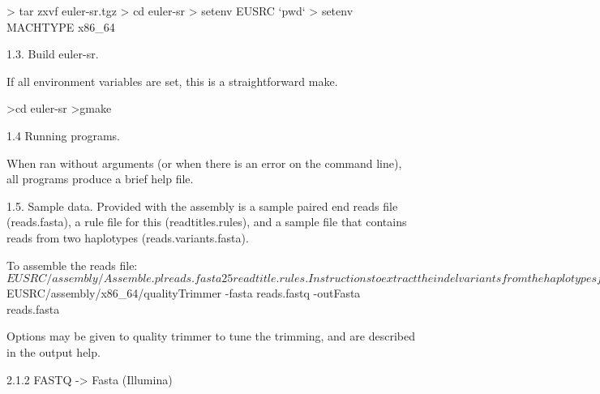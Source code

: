\documentclass{article}[12pt]
\begin{document}
> tar zxvf euler-sr.tgz
> cd euler-sr
> setenv EUSRC  `pwd`
> setenv MACHTYPE x86\_64


1.3. Build euler-sr.  

If all environment variables are set, this is a straightforward make.

>cd euler-sr
>gmake


1.4 Running programs.

	 When ran without arguments (or when there is an error on the
	 command line), all programs produce a brief help file.


1.5. Sample data.
  Provided with the assembly is a sample paired end reads file
  (reads.fasta), a rule file for this (readtitles.rules), and a sample
  file that contains reads from two haplotypes (reads.variants.fasta).

	To assemble the reads file:
	${EUSRC}/assembly/Assemble.pl reads.fasta 25 readtitle.rules.

	Instructions to extract the indel variants from the haplotypes file
	are given below.

	

2. CLEANING UP DATA

The assembly quality is strongly dependent on how clean the data is.
Quality values may be used to trim/remove low quality reads.  If you
are assembling Illumina reads, particularly those produced by the
first generation sequencer, some extra programs are provided to filter
reads that have errors particular to the system (discussed below).

2.1 Translating data.

  EULER-SR takes as input a single fasta file with ALL reads, an
  optional mate file that specifies mate-pairing (which may be
  generated), and a rule file that describes how to map a fasta title
  to a clone type.

	Utilities are provided to translate from:
	  .sff (the 454 binary output file).
		.fastq (Sanger format)
		.fastq (Illumina quality values).

2.1.1 FASTQ -> Fasta (Sanger)

  To translate fastq to fasta, use the quality trimmer, given reads.fastq

	${EUSRC}/assembly/x86\_64/qualityTrimmer	-fasta reads.fastq -outFasta reads.fasta

	Options may be given to quality trimmer to tune the trimming, and
	are described in the output help.

2.1.2 FASTQ -> Fasta (Illumina)
	
\end{document}
